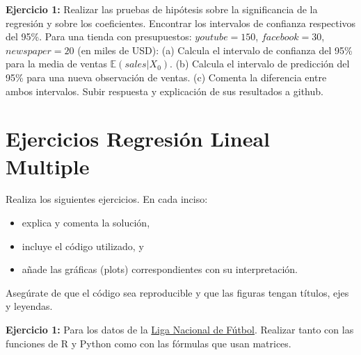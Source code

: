 \documentclass[
]{book}
\begin{document}
\textbf{Ejercicio 1:} Realizar las pruebas de hipótesis sobre la significancia de la regresión y sobre los coeficientes. Encontrar los intervalos de confianza respectivos del 95\%.
Para una tienda con presupuestos:
\(youtube = 150\), \(facebook = 30\), \(newspaper=20\) (en miles de USD):
(a) Calcula el intervalo de confianza del 95\% para la media de ventas \(\mathbb{E}(sales | X_0)\).
(b) Calcula el intervalo de predicción del 95\% para una nueva observación de ventas.
(c) Comenta la diferencia entre ambos intervalos.
Subir respuesta y explicación de sus resultados a github.

\section{Ejercicios Regresión Lineal Multiple}\label{ejercicios-regresiuxf3n-lineal-multiple}

Realiza los siguientes ejercicios. En cada inciso:

\begin{itemize}
\item
  explica y comenta la solución,
\item
  incluye el código utilizado, y
\item
  añade las gráficas (plots) correspondientes con su interpretación.
\end{itemize}

Asegúrate de que el código sea reproducible y que las figuras tengan títulos, ejes y leyendas.

\textbf{Ejercicio 1:} Para los datos de la \href{https://github.com/HaydeePeruyero/MultivariateStatisticalAnalysis/tree/main/data/Liga_nacional_de_futbol.csv}{Liga Nacional de Fútbol}. Realizar tanto con las funciones de R y Python como con las fórmulas que usan matrices.
\end{document}
